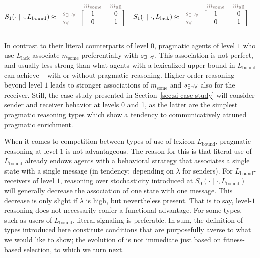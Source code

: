 \documentclass[a4paper, 11pt]{article}
\theoremstyle{Satz}
\newcommand{\state}{\ensuremath{s}\xspace}		%
\newcommand{\mystate}[1]{\ensuremath{\state_{\text{#1}}}\xspace} %
\newcommand{\mylang}[1]{\ensuremath{L_{\text{#1}}}\xspace} %
\newcommand{\messg}{\ensuremath{m}\xspace}		%
\newcommand{\mymessg}[1]{\ensuremath{\messg_{\text{#1}}}\xspace} %
\newcommand{\ssome}{\mystate{\ensuremath{\exists\neg\forall}}}
\newcommand{\sall}{\mystate{\ensuremath{\forall}}}
\newcommand{\msome}{\mymessg{some}}
\newcommand{\mall}{\mymessg{all}}
\newcommand{\Lbound}{\mylang{bound}}
\newcommand{\Llack}{\mylang{lack}}
\newcommand{\mygray}[1]{{\textcolor{mygray}{#1}}}
\begin{document}
\begin{align*}
  S_1(\cdot \mid \cdot, \Lbound) & \approx \begin{blockarray}{lcc}
    & \mygray{\msome} & \mygray{\mall} \\
    \begin{block}{l[cc]}
      \mygray{\ssome} & 1 & 0 \\
      \mygray{\sall}  & 0 & 1 \\
    \end{block}
  \end{blockarray} &
  S_1(\cdot \mid \cdot, \Llack) & \approx \begin{blockarray}{lcc}
    & \mygray{\msome} & \mygray{\mall} \\
    \begin{block}{l[cc]}
      \mygray{\ssome} & 1 & 0 \\
      \mygray{\sall}  & 0 & 1 \\
    \end{block}
  \end{blockarray} 
\end{align*}


In contrast to their literal counterparts of level $0$, pragmatic agents of level $1$ who use
$\Llack$ associate $\msome$ preferentially with $\ssome$. This association is not perfect, and
usually less strong than what agents with a lexicalized upper bound in $\Lbound$ can achieve --
with or without pragmatic reasoning. Higher order reasoning beyond level $1$ leads to stronger
associations of $\msome$ and $\ssome$ also for the receiver. Still, the case study presented in
Section~\ref{sec:si-case-study} will consider sender and receiver behavior at levels 0 and 1,
as the latter are the simplest pragmatic reasoning types which show a tendency to
communicatively attuned pragmatic enrichment.

When it comes to competition between types of use of lexicon $\Lbound$, pragmatic reasoning at
level $1$ is not advantageous. The reason for this is that literal use of $\Lbound$ already
endows agents with a behavioral strategy that associates a single state with a single message
(in tendency; depending on $\lambda$ for senders). For $\Lbound$-receivers of level $1$,
reasoning over stochasticity introduced at $S_0( \cdot \mid \cdot, \Lbound)$ will generally
decrease the association of one state with one message. This decrease is only slight if
$\lambda$ is high, but nevertheless present. That is to say, level-$1$ reasoning does not
necessarily confer a functional advantage. For some types, such as users of $\Lbound$, literal
signaling is preferable. In sum, the definition of types introduced here constitute conditions
that are purposefully averse to what we would like to show; the evolution of is not immediate
just based on fitness-based selection, to which we turn next.
\end{document}

